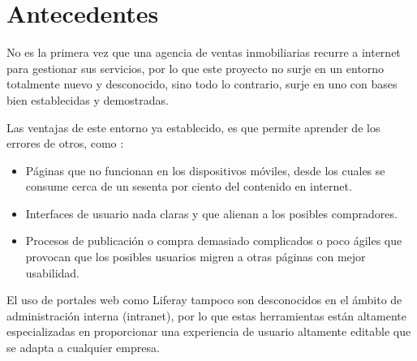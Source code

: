 \section{Antecedentes}
\par No es la primera vez que una agencia de ventas inmobiliarias recurre a internet para gestionar sus servicios, por lo que este proyecto no surje en un entorno totalmente nuevo y desconocido, sino todo lo contrario, surje en uno con bases bien establecidas y demostradas.

\par Las ventajas de este entorno ya establecido, es que permite aprender de los errores de otros, como :
\begin{itemize}[-]
	\item Páginas que no funcionan en los dispositivos móviles, desde los cuales se consume cerca de un sesenta por ciento del contenido en internet.
	\item Interfaces de usuario nada claras y que alienan a los posibles compradores.
	\item Procesos de publicación o compra demasiado complicados o poco ágiles que provocan que los posibles usuarios migren a otras páginas con mejor usabilidad.
\end{itemize}

\par El uso de portales web como Liferay tampoco son desconocidos en el ámbito de administración interna (intranet), por lo que estas herramientas están altamente especializadas en proporcionar una experiencia de usuario altamente editable que se adapta a cualquier empresa.